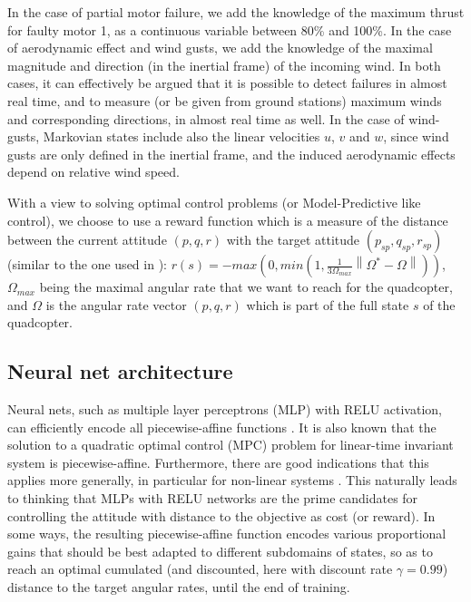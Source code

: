 \documentclass[anonymous=true,format=sigconf, screen=true, review=false]{acmart}
\begin{document}
In the case of partial motor failure, we add the knowledge of the maximum thrust for faulty motor 1, as a continuous variable between 80\% and 100\%. In the case of aerodynamic effect and wind gusts, we add the knowledge of the maximal magnitude and direction (in the inertial frame) of the incoming wind. In both cases, it can effectively be argued that it is possible to detect failures in almost real time, and to measure (or be given from ground stations) maximum winds and corresponding directions, in almost real time as well. In the case of wind-gusts, Markovian states include also the linear velocities $u$, $v$ and $w$, since wind gusts are only defined in the inertial frame, and the induced aerodynamic effects depend on relative wind speed. 

With a view to solving optimal control problems (or Model-Predictive like control), we choose to use a reward function 
which is a measure of the distance between the current attitude $(p,q,r)$ with the target attitude $(p_{sp}, q_{sp}, r_{sp})$ (similar to the one used in \cite{rl}): 
$r(s) = - max\left(0, min\left(1, \frac{1}{3\Omega_{max}} \left\lVert \Omega^* - \Omega \right\rVert\right)\right) $, 
\noindent $\Omega_{max}$ being the maximal angular rate that we want to reach for the quadcopter, and $\Omega$ is the angular rate vector $(p,q,r)$ which is part of the full state $s$ of the quadcopter.


\subsection{Neural net architecture}

\label{sec:neuralnetarchi}

Neural nets, such as multiple layer perceptrons (MLP) with RELU activation, can efficiently encode all piecewise-affine functions \cite{RELUnet}. It is also known \cite{MPC} that the solution to a quadratic optimal control (MPC) problem for linear-time invariant system is piecewise-affine. Furthermore, there are good indications that this applies more generally, in particular for non-linear systems \cite{nonlinearmpc}. This naturally leads to thinking that MLPs with RELU networks are the prime candidates for controlling the attitude with distance to the objective as cost (or reward). In some ways, the resulting piecewise-affine function encodes various proportional gains that should be best adapted to different subdomains of states, so as to reach an optimal cumulated (and discounted, here with discount rate $\gamma=0.99$) distance to the target angular rates, until the end of training.
\end{document}
